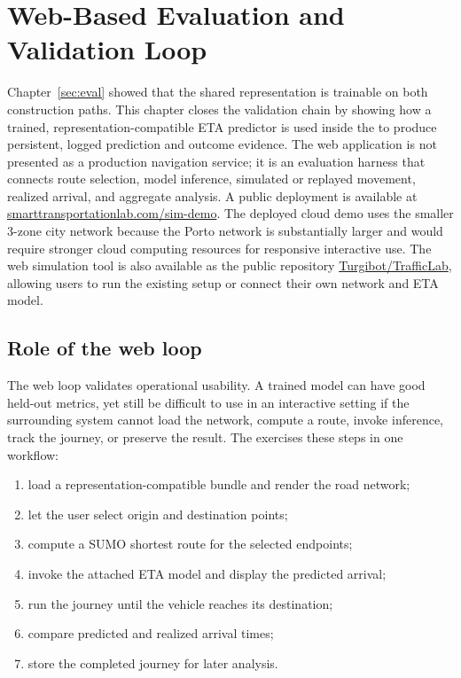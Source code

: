 \chapter{Web-Based Evaluation and Validation Loop}\label{sec:web}

\begin{sloppypar}
Chapter~\ref{sec:eval} showed that the shared representation is trainable on both construction paths. This chapter closes the validation chain by showing how a trained, representation-compatible ETA predictor is used inside the \WebApp{} to produce persistent, logged prediction and outcome evidence. The web application is not presented as a production navigation service; it is an evaluation harness that connects route selection, model inference, simulated or replayed movement, realized arrival, and aggregate analysis. A public deployment is available at \href{https://smarttransportationlab.com/sim-demo}{smarttransportationlab.com/sim-demo}. The deployed cloud demo uses the smaller 3-zone city network because the Porto network is substantially larger and would require stronger cloud computing resources for responsive interactive use. The web simulation tool is also available as the public repository \href{https://github.com/Turgibot/TrafficLab}{Turgibot/TrafficLab}, allowing users to run the existing setup or connect their own network and ETA model.
\end{sloppypar}

\section{Role of the web loop}
The web loop validates operational usability. A trained model can have good held-out metrics, yet still be difficult to use in an interactive setting if the surrounding system cannot load the network, compute a route, invoke inference, track the journey, or preserve the result. The \WebApp{} exercises these steps in one workflow:
\begin{enumerate}
    \item load a representation-compatible bundle and render the road network;
    \item let the user select origin and destination points;
    \item compute a SUMO shortest route for the selected endpoints;
    \item invoke the attached ETA model and display the predicted arrival;
    \item run the journey until the vehicle reaches its destination;
    \item compare predicted and realized arrival times;
    \item store the completed journey for later analysis.
\end{enumerate}

